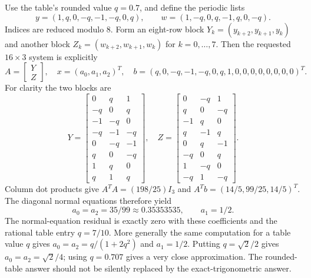 Use the table's rounded value $q=0.7$, and define the periodic lists
\[
 y=(1,q,0,-q,-1,-q,0,q),\qquad
 w=(1,-q,0,q,-1,q,0,-q).
\]
Indices are reduced modulo $8$. Form an eight-row block
$Y_k=(y_{k+2},y_{k+1},y_k)$ and another block
$Z_k=(w_{k+2},w_{k+1},w_k)$ for $k=0,\ldots,7$.
Then the requested $16\times3$ system is explicitly
\[
 A=\begin{bmatrix}Y\\Z\end{bmatrix},\quad
 x=(a_0,a_1,a_2)^T,\quad
 b=(q,0,-q,-1,-q,0,q,1,0,0,0,0,0,0,0,0)^T.
\]
For clarity the two blocks are
\[
 Y=\begin{bmatrix}0&q&1\\-q&0&q\\-1&-q&0\\-q&-1&-q\\0&-q&-1\\q&0&-q\\1&q&0\\q&1&q\end{bmatrix},\quad
 Z=\begin{bmatrix}0&-q&1\\q&0&-q\\-1&q&0\\q&-1&q\\0&q&-1\\-q&0&q\\1&-q&0\\-q&1&-q\end{bmatrix}.
\]
Column dot products give $A^TA=(198/25)I_3$ and
$A^Tb=(14/5,99/25,14/5)^T$. The diagonal normal equations
therefore yield
\[
 \boxed{a_0=a_2=35/99\approx0.35353535,\qquad a_1=1/2}.
\]
The normal-equation residual is exactly zero with these coefficients
and the rational table entry $q=7/10$.
More generally the same computation for a table value $q$ gives
$a_0=a_2=q/(1+2q^2)$ and $a_1=1/2$.
Putting $q=\sqrt2/2$ gives $a_0=a_2=\sqrt2/4$; using $q=0.707$
gives a very close approximation. The rounded-table answer should
not be silently replaced by the exact-trigonometric answer.
